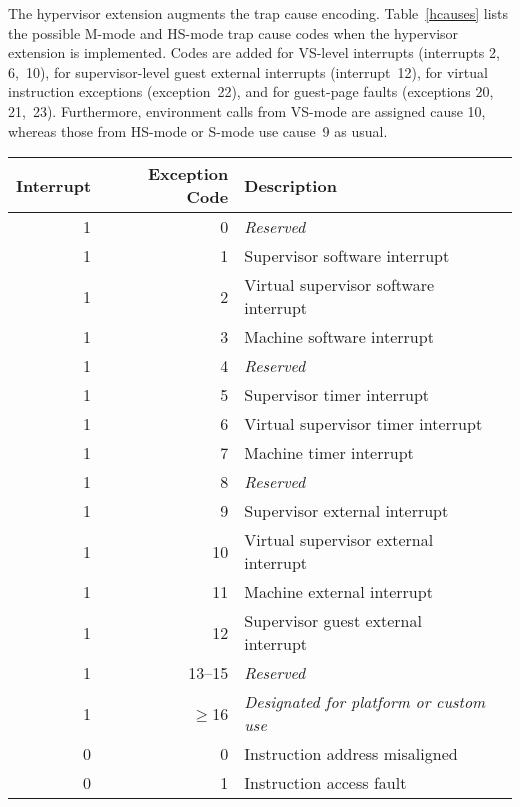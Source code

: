 The hypervisor extension augments the trap cause encoding.
Table~\ref{hcauses} lists the possible M-mode and HS-mode trap cause
codes when the hypervisor extension is implemented.
Codes are added for VS-level interrupts (interrupts 2, 6,~10), for
supervisor-level guest external interrupts (interrupt~12), for virtual
instruction exceptions (exception~22), and for guest-page faults
(exceptions 20, 21,~23).
Furthermore, environment calls from VS-mode are assigned cause 10,
whereas those from HS-mode or S-mode use cause~9 as usual.

\begin{table*}[p]
\begin{center}
\begin{tabular}{|r|r|l|l|}
  \hline
  Interrupt & Exception Code  & Description \\
  \hline
  1         & 0               & {\em Reserved} \\
  1         & 1               & Supervisor software interrupt \\
  1         & 2               & Virtual supervisor software interrupt \\
  1         & 3               & Machine software interrupt \\ \hline
  1         & 4               & {\em Reserved} \\
  1         & 5               & Supervisor timer interrupt \\
  1         & 6               & Virtual supervisor timer interrupt \\
  1         & 7               & Machine timer interrupt \\ \hline
  1         & 8               & {\em Reserved} \\
  1         & 9               & Supervisor external interrupt \\
  1         & 10              & Virtual supervisor external interrupt \\
  1         & 11              & Machine external interrupt \\ \hline
  1         & 12              & Supervisor guest external interrupt \\
  1         & 13--15          & {\em Reserved} \\
  1         & $\ge$16         & {\em Designated for platform or custom use} \\ \hline
  0         & 0               & Instruction address misaligned \\
  0         & 1               & Instruction access fault \\

\end{tabular}
\end{center}
\end{table*}
